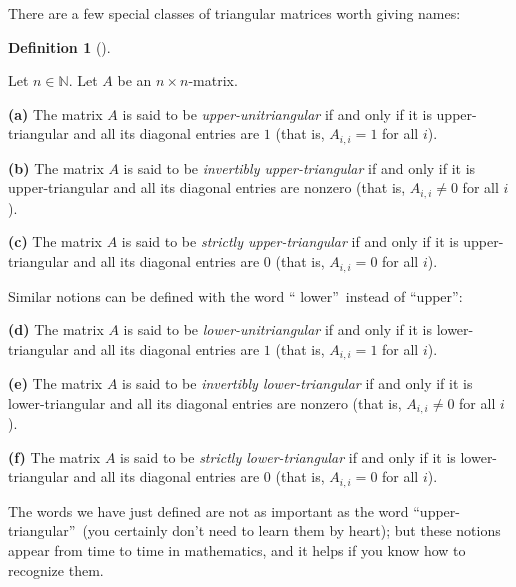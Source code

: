 \documentclass[numbers=enddot,12pt,final,onecolumn,notitlepage]{scrartcl}%
\theoremstyle{definition}
\newtheorem{defi}[theo]{Definition}
\newenvironment{definition}[1][]
{\begin{defi}[#1]\begin{leftbar}}
{\end{leftbar}\end{defi}}
\begin{document}
There are a few special classes of triangular matrices worth giving names:

\begin{definition}
\label{def.triangular.uni-up}Let $n\in\mathbb{N}$. Let $A$ be an $n\times n$-matrix.

\textbf{(a)} The matrix $A$ is said to be \textit{upper-unitriangular} if and
only if it is upper-triangular and all its diagonal entries are $1$ (that is,
$A_{i,i}=1$ for all $i$).

\textbf{(b)} The matrix $A$ is said to be \textit{invertibly upper-triangular}
if and only if it is upper-triangular and all its diagonal entries are nonzero
(that is, $A_{i,i}\neq0$ for all $i$).

\textbf{(c)} The matrix $A$ is said to be \textit{strictly upper-triangular}
if and only if it is upper-triangular and all its diagonal entries are $0$
(that is, $A_{i,i}=0$ for all $i$).

Similar notions can be defined with the word \textquotedblleft
lower\textquotedblright\ instead of \textquotedblleft upper\textquotedblright:

\textbf{(d)} The matrix $A$ is said to be \textit{lower-unitriangular} if and
only if it is lower-triangular and all its diagonal entries are $1$ (that is,
$A_{i,i}=1$ for all $i$).

\textbf{(e)} The matrix $A$ is said to be \textit{invertibly lower-triangular}
if and only if it is lower-triangular and all its diagonal entries are nonzero
(that is, $A_{i,i}\neq0$ for all $i$).

\textbf{(f)} The matrix $A$ is said to be \textit{strictly lower-triangular}
if and only if it is lower-triangular and all its diagonal entries are $0$
(that is, $A_{i,i}=0$ for all $i$).
\end{definition}

The words we have just defined are not as important as the word
\textquotedblleft upper-triangular\textquotedblright\ (you certainly don't
need to learn them by heart); but these notions appear from time to time in
mathematics, and it helps if you know how to recognize them.
\end{document}
